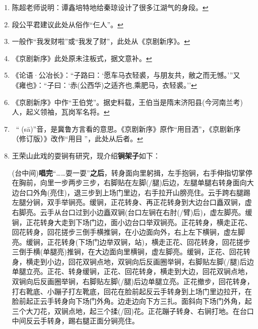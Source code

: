 \begin{enumerate}
  \protect\hyperlink{fnref306}{↩}
\item
  \leavevmode\hypertarget{fn307}{}%
  陈超老师说明：谭鑫培特地给秦琼设计了很多江湖气的身段。\protect\hyperlink{fnref307}{↩}
\item
  \leavevmode\hypertarget{fn308}{}%
  段公平君建议此处从俗作``仨人''。\protect\hyperlink{fnref308}{↩}
\item
  \leavevmode\hypertarget{fn309}{}%
  一般作``我发财啦''或``我发了财''，此处从《京剧新序》。\protect\hyperlink{fnref309}{↩}
\item
  \leavevmode\hypertarget{fn310}{}%
  《京剧新序》此处原未注板式，据文意补。\protect\hyperlink{fnref310}{↩}
\item
  \leavevmode\hypertarget{fn311}{}%
  《论语·公冶长》：``子路曰：`愿车马衣轻裘，与朋友共，敝之而无憾。'''又《雍也》：``子曰：`赤(公西华)之适齐也,乘肥马，衣轻裘。''\protect\hyperlink{fnref311}{↩}
\item
  \leavevmode\hypertarget{fn312}{}%
  《京剧新序》中作``王伯党''。据史料载，王伯当是隋末济阳县(今河南兰考)人，起义领袖，瓦岗军名将。\protect\hyperlink{fnref312}{↩}
\item
  \leavevmode\hypertarget{fn313}{}%
  {\fzsong 𥋌}念``撒(sā)''音，是冀鲁方言看的意思。《京剧新序》原作``用目洒''，《京剧新序（修订版）》改作``用目{\fzsong 𥋌}''，此处从后者。\protect\hyperlink{fnref313}{↩}
\item
  \leavevmode\hypertarget{fn314}{}%
  王荣山此戏的耍锏有研究，现介绍\textbf{锏架子}如下：

  (台中间)\textbf{唱完}``\ldots{}\ldots{}耍一耍''\textbf{之后}，转身面向里躬揖，左手抱锏，右手伸指切掌停在胸前，向里一步两步三步，右脚贴在左脚(/腿)后边，左腿单腿右转身面向大边台口外角(亮住)，退三步到上场门里边，右手拉开山膀亮住。云手跨右腿踢左腿分锏，双手举锏亮。缓锏，正花转身、再正花转身到大边台口矗双锏，虚右脚亮。云手从台口过到小边矗双锏(台口左锏在右肘(/臂)后)，虚左脚亮。缓锏，正花转身大走到下场门边，面小边台口举双锏亮。正花转身，横走正花、回花转身，回花搓步三倒手横推锏，在小边面向外，右上左下横锏，虚左脚亮。缓锏，正花转身(下场门边举双锏，站)，横走正花、回花转身，回花搓步三倒手横(单腿亮)推锏，在大边面向里横锏，虚左脚亮。缓锏，正花、回花转身，横走到小边，回花双锏点地，双锏向后反画圈举锏，右脚贴左脚(/腿)后边单腿立亮。正花、转身缓锏，正花、回花转身，横走到大边，回花双锏点地，双锏向后反画圈举锏，右脚贴左脚(/腿)后边单腿立亮。正花撤步，回花转身，打右靴底、小蹦子打左靴底，回花在脸前起反云手转身到上场门里边拉开，在脸前起正云手转身向下场门外角。边走边向下方三扎。面斜向下场门外角，起三个大刀花，双锏点地，起三个揉(/回)花。正花蹦子转身、右锏打地。在台口中间反云手转身，踢右腿正面分锏亮住。


\end{enumerate}
